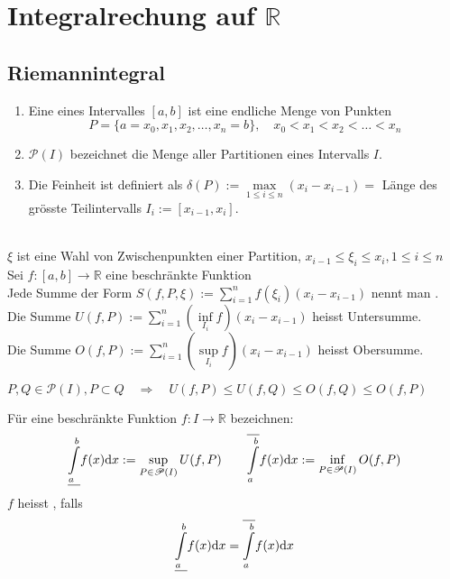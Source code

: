 \section{Integralrechung auf $\mathbb{R}$}
	\subsection{Riemannintegral}
		\begin{definition}[Partition]
			\hfill
			\begin{enumerate}
				\item Eine  eines Intervalles $[a,b]$ ist eine endliche Menge von Punkten
				$$ P = \{ a = x_0, x_1, x_2, \dots, x_n = b \}, \quad x_0 < x_1 < x_2 < \dots < x_n$$
				\item $\mathscr{P}(I)$ bezeichnet die Menge aller Partitionen eines Intervalls $I$. 
				\item Die Feinheit ist definiert als $\delta(P) := \max\limits_{1\leq i \leq n} (x_i - x_{i - 1}) = $ Länge des grösste Teilintervalls $I_i:= [x_{i-1}, x_i]$.
			\end{enumerate}
		\end{definition}
		\begin{definition}[Riemannsumme]
			\hfill\\
			$\xi$ ist eine Wahl von Zwischenpunkten einer Partition, $x_{i-1} \leq \xi_i \leq x_i, 1 \leq i \leq n$ \\
			Sei $f:[a,b] \to \mathbb{R}$ eine beschränkte Funktion \\
			Jede Summe der Form $S(f,P,\xi) := \sum\limits_{i = 1}^{n} f(\xi_i)(x_{i}-x_{i-1})$ nennt man . \\
			Die Summe $U(f,P) := \sum\limits_{i = 1}^{n} (\inf\limits_{I_i}f)(x_{i}-x_{i-1})$ heisst Untersumme. \\
			Die Summe $O(f,P) := \sum\limits_{i = 1}^{n} (\sup\limits_{I_i}f)(x_{i}-x_{i-1})$ heisst Obersumme. \\
		\end{definition}
		\begin{proofhelp}
			$P,Q \in \mathscr{P}(I), P \subset Q \quad\Rightarrow\quad U(f,P) \leq U(f,Q) \leq O(f,Q) \leq O(f,P)$
		\end{proofhelp}
		\begin{definition}
			Für eine beschränkte Funktion $f:I \to \mathbb{R}$ bezeichnen:
			$$\underline{\int\limits_{a}^{b}}f(x)\mathrm{d} x := \sup\limits_{P \in \mathscr{P}(I)} U(f,P) \qquad \overline{\int\limits_{a}^{b}}f(x)\mathrm{d} x := \inf\limits_{P \in \mathscr{P}(I)} O(f,P)$$
			$f$ heisst , falls 
			$$ \underline{\int\limits_{a}^{b}}f(x)\mathrm{d} x = \overline{\int\limits_{a}^{b}}f(x)\mathrm{d} x$$ 
		\end{definition}
